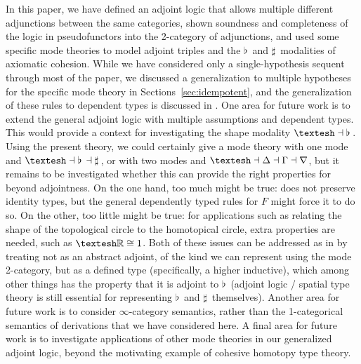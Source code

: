 \documentclass{drl-common/llncs}
\newcommand{\la}{\ensuremath{\dashv}}
\newcommand{\sh}{\text{\textesh}}
\newcommand\Flat[1]{\ensuremath{\flat \, {#1}}}
\newcommand\Sharp[1]{\ensuremath{\sharp \, {#1}}}
\begin{document}
In this paper, we have defined an adjoint logic that allows multiple
different adjunctions between the same categories, shown soundness and
completeness of the logic in pseudo\-functors into the 2-category of
adjunctions, and used some specific mode theories to model adjoint
triples and the $\Flat{}$ and $\Sharp{}$ modalities of axiomatic
cohesion.  While we have considered only a single-hypothesis sequent
through most of the paper, we discussed a generalization to multiple
hypotheses for the specific mode theory in
Sections~\ref{sec:idempotent}, and the generalization of these rules to
dependent types is discussed in \citet{shulman15realcohesion}.  One area
for future work is to extend the general adjoint logic with multiple
assumptions and dependent types.  This would provide a context for
investigating the shape modality $\sh{} \la \Flat{}$.  Using the present
theory, we could certainly give a mode theory with one mode and $\sh{}
\la \Flat{} \la \Sharp{}$, or with two modes and $\sh \la \Delta \la
\Gamma \la \nabla$, but it remains to be investigated whether this can
provide the right properties for \sh{} beyond adjointness.  On the one
hand, too much might be true: \sh{} does not preserve identity types,
but the general dependently typed rules for $F$ might force it to do
so. On the other, too little might be true: for applications such as
relating the shape of the topological circle to the homotopical circle,
extra properties are needed, such as $\sh{\mathbb{R}} \cong 1$.  Both of
these issues can be addressed as in \citep{shulman15realcohesion} by
treating \sh{} not as an abstract adjoint, of the kind we can represent
using the mode 2-category, but as a defined type (specifically, a higher
inductive), which among other things has the property that it is adjoint
to $\Flat{}$ (adjoint logic / spatial type theory is still essential for
representing $\Flat{}$ and $\Sharp{}$ themselves).  Another area for
future work is to consider $\infty$-category semantics, rather than the
1-categorical semantics of derivations that we have considered here.  A
final area for future work is to investigate applications of other mode
theories in our generalized adjoint logic, beyond the motivating example
of cohesive homotopy type theory.

{ %


}
\end{document}

